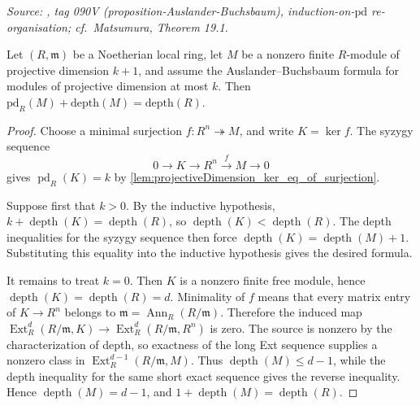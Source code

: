 \begin{lemma}[Auslander--Buchsbaum: inductive step \(\text{pd} = k+1\)]\leanok
  \label{lem:auslander_buchsbaum_formula_succ_pd}
  \textit{Source: \cite{stacks-project}, tag 090V (proposition-Auslander-Buchsbaum),
  induction-on-\(\text{pd}\) re-organisation; cf.\ Matsumura, Theorem 19.1.}

  Let \((R,\mathfrak m)\) be a Noetherian local ring, let \(M\) be a
  nonzero finite \(R\)-module of projective dimension \(k+1\), and assume
  the Auslander--Buchsbaum formula for modules of projective dimension at
  most \(k\). Then
  \(\text{pd}_R(M) + \text{depth}(M) = \text{depth}(R)\).
\end{lemma}
\begin{proof}
  \leanok
  Choose a minimal surjection \(f:R^n\twoheadrightarrow M\), and write
  \(K=\ker f\). The syzygy sequence
  \[
    0\longrightarrow K\longrightarrow R^n\xrightarrow{f}M\longrightarrow 0
  \]
  gives \(\operatorname{pd}_R(K)=k\) by
  \cref{lem:projectiveDimension_ker_eq_of_surjection}.

  Suppose first that \(k>0\). By the inductive hypothesis,
  \(k+\operatorname{depth}(K)=\operatorname{depth}(R)\), so
  \(\operatorname{depth}(K)<\operatorname{depth}(R)\). The depth
  inequalities for the syzygy sequence then force
  \(\operatorname{depth}(K)=\operatorname{depth}(M)+1\). Substituting
  this equality into the inductive hypothesis gives the desired formula.

  It remains to treat \(k=0\). Then \(K\) is a nonzero finite free
  module, hence \(\operatorname{depth}(K)=\operatorname{depth}(R)=d\).
  Minimality of \(f\) means that every matrix entry of
  \(K\to R^n\) belongs to \(\mathfrak m=\operatorname{Ann}_R(R/\mathfrak m)\).
  Therefore the induced map
  \(\operatorname{Ext}^d_R(R/\mathfrak m,K)\to
  \operatorname{Ext}^d_R(R/\mathfrak m,R^n)\) is zero. The source is
  nonzero by the characterization of depth, so exactness of the long
  Ext sequence supplies a nonzero class in
  \(\operatorname{Ext}^{d-1}_R(R/\mathfrak m,M)\). Thus
  \(\operatorname{depth}(M)\leq d-1\), while the depth inequality for
  the same short exact sequence gives the reverse inequality. Hence
  \(\operatorname{depth}(M)=d-1\), and
  \(1+\operatorname{depth}(M)=\operatorname{depth}(R)\).
\end{proof}

